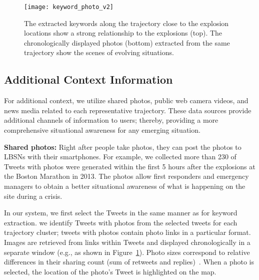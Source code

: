\begin{figure}[htb]
	\centering
	\texttt{[image: keyword\_photo\_v2]}
	\caption{
The extracted keywords along the trajectory close to the explosion locations show a strong relationship to the explosions (top).
The chronologically displayed photos (bottom) extracted from the same trajectory show the scenes of evolving situations.
}
	\label{fig:keyword_photo}
\end{figure}

\subsection{Additional Context Information}
For additional context, we utilize shared photos, public web camera videos, and news media related to each representative trajectory.
These data sources provide additional channels of information to users; thereby, providing a more comprehensive situational awareness for any emerging situation. 

\textbf{Shared photos:}
Right after people take photos, they can post the photos to LBSNs with their smartphones.
For example, we collected more than 230 of Tweets with photos were generated within the first 5 hours after the explosions at the Boston Marathon in 2013.
The photos allow first responders and emergency managers to obtain a better situational awareness of what is happening on the site during a crisis.

In our system, we first select the Tweets in the same manner as for keyword extraction.
we identify Tweets with photos from the selected tweets for each trajectory cluster; tweets with photos contain photo links in a particular format.
Images are retrieved from links within Tweets and displayed chronologically in a separate window (e.g., as shown in Figure~\ref{fig:keyword_photo}).
Photo sizes correspond to relative differences in their sharing count (sum of retweets and replies)~\cite{Dork:2010:Visual}.
When a photo is selected, the location of the photo's Tweet is highlighted on the map.

